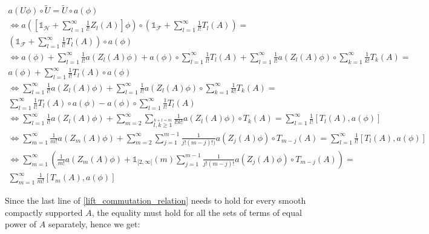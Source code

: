 \documentclass[a4paper,12pt]{article}
\begin{document}
\begin{multline}\label{lift_commutation_relation}
a\left( U \phi \right)  \circ \tilde{U}=\tilde{U} \circ a(\phi)\\
\iff a\left( \left[\mathds{1}_\mathcal{H}+\sum_{l=1}^\infty \frac{1}{l!} Z_l (A) \right]\phi \right)  \circ \left(\mathds{1}_\mathcal{F}+\sum_{l=1}^\infty \frac{1}{l!} T_l(A)\right)=\\\left(\mathds{1}_\mathcal{F}+\sum_{l=1}^\infty \frac{1}{l!} T_l(A) \right)\circ a(\phi)\\
\iff a(\phi)+\sum_{l=1}^\infty \frac{1}{l!} a\left(Z_l (A) \phi \right) + a(\phi)\circ\sum_{l=1}^\infty \frac{1}{l!} T_l(A)+ \sum_{l=1}^\infty \frac{1}{l!} a\left(Z_l (A) \phi \right)\circ\sum_{k=1}^\infty \frac{1}{k!} T_k(A)=\\
a(\phi)+\sum_{l=1}^\infty \frac{1}{l!} T_l(A) \circ a(\phi)\\
\iff \sum_{l=1}^\infty \frac{1}{l!} a\left(Z_l (A) \phi \right) + \sum_{l=1}^\infty \frac{1}{l!} a\left(Z_l (A) \phi \right)\circ\sum_{k=1}^\infty \frac{1}{k!} T_k(A)=\\ 
\sum_{l=1}^\infty \frac{1}{l!} T_l(A) \circ a(\phi)- a(\phi)\circ\sum_{l=1}^\infty \frac{1}{l!} T_l(A)\\
\iff \sum_{l=1}^\infty \frac{1}{l!} a\left(Z_l (A) \phi \right) + \sum_{m=2}^\infty\sum_{\stackrel{k+l=m}{l,k\ge1}} \frac{1}{l! k!} a\left(Z_l (A) \phi \right)\circ T_k(A)=\sum_{l=1}^\infty \frac{1}{l!} \left[T_l(A) , a(\phi)\right]\\
\iff \sum_{m=1}^\infty \frac{1}{m!} a\left(Z_m (A) \phi \right) + \sum_{m=2}^\infty\sum_{j=1}^{m-1} \frac{1}{j!(m-j)!)} a\left(Z_j (A) \phi \right)\circ T_{m-j}(A)=\sum_{l=1}^\infty \frac{1}{l!} \left[T_l(A) , a(\phi)\right]\\
\iff \sum_{m=1}^\infty  \left(\frac{1}{m!} a\left(Z_m (A) \phi \right) + \mathds{1}_{[2,\infty[}(m)\sum_{j=1}^{m-1}\frac{1}{j!(m-j)!}  a\left(Z_j (A) \phi \right)\circ T_{m-j}(A)\right)=\\
\sum_{m=1}^\infty \frac{1}{m!}\left[T_m(A) , a(\phi)\right]
\end{multline}

Since the last line of \eqref{lift_commutation_relation} needs to hold for every smooth compactly supported \(A\), the equality must hold for all the sets of terms of equal power of \(A\) separately, hence we get:
\end{document}
